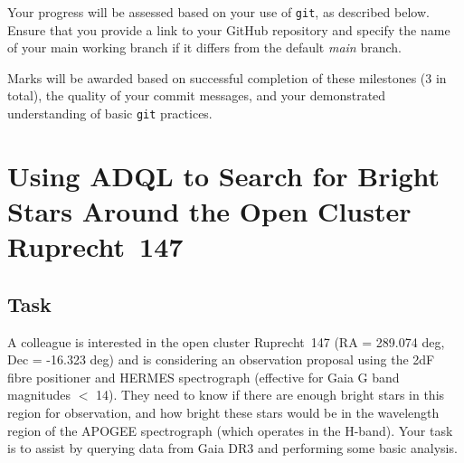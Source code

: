 \documentclass[a4paper,12pt]{article}
\begin{document}
Your progress will be assessed based on your use of \texttt{git}, as described below. Ensure that you provide a link to your GitHub repository and specify the name of your main working branch if it differs from the default \textit{main} branch. 

Marks will be awarded based on successful completion of these milestones (3 in total), the quality of your commit messages, and your demonstrated understanding of basic \texttt{git} practices.

\newpage

\section{Using ADQL to Search for Bright Stars Around the Open Cluster Ruprecht~147}

\subsection{Task}

A colleague is interested in the open cluster Ruprecht~147 (RA = 289.074 deg, Dec = -16.323 deg) and is considering an observation proposal using the 2dF fibre positioner and HERMES spectrograph (effective for Gaia G band magnitudes $<$ 14). They need to know if there are enough bright stars in this region for observation, and how bright these stars would be in the wavelength region of the APOGEE spectrograph (which operates in the H-band). Your task is to assist by querying data from Gaia DR3 and performing some basic analysis.
\end{document}
